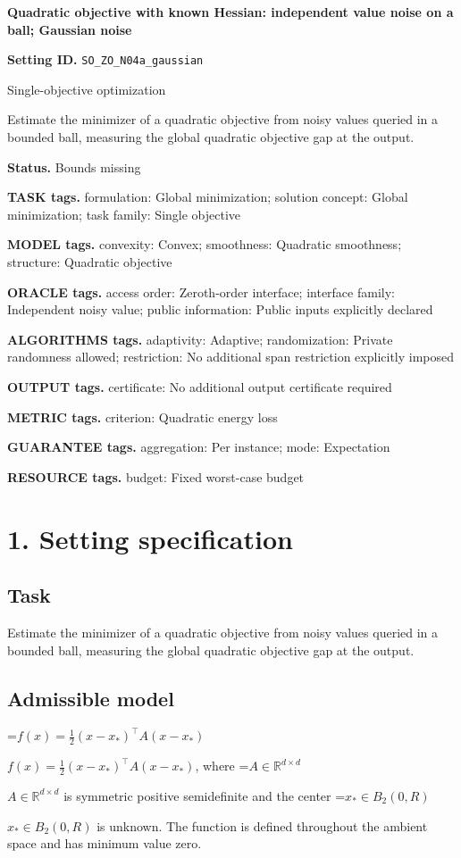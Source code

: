 \documentclass[10pt,a4paper]{article}
\newcommand{\AtlasMath}[1]{\par\begingroup\centering\setbox0=\hbox{$\displaystyle #1$}\ifdim\wd0>1.4\linewidth\typeout{ATLAS WIDE FORMULA: \the\wd0}\fi\ifdim\wd0>\linewidth\resizebox{\linewidth}{!}{\box0}\else\box0\fi\par\endgroup}
\newcommand{\AtlasInlineMath}[1]{\begingroup\setbox0=\hbox{$#1$}\ifdim\wd0>.4\linewidth\endgroup\AtlasMath{#1}\else\endgroup$#1$\fi}
\begin{document}
\raggedright

{\LARGE\bfseries\sffamily\color{AtlasNavy} Quadratic objective with known Hessian: independent value noise on a ball; Gaussian noise\par}\vspace{5pt}
\textbf{Setting ID.} \texttt{SO\_\allowbreak{}ZO\_\allowbreak{}N04a\_\allowbreak{}gaussian}

Single-objective optimization

Estimate the minimizer of a quadratic objective from noisy values queried in a bounded ball, measuring the global quadratic objective gap at the output.

\textbf{Status.} Bounds missing

\textbf{TASK tags.} formulation: Global minimization; solution concept: Global minimization; task family: Single objective

\textbf{MODEL tags.} convexity: Convex; smoothness: Quadratic smoothness; structure: Quadratic objective

\textbf{ORACLE tags.} access order: Zeroth-order interface; interface family: Independent noisy value; public information: Public inputs explicitly declared

\textbf{ALGORITHMS tags.} adaptivity: Adaptive; randomization: Private randomness allowed; restriction: No additional span restriction explicitly imposed

\textbf{OUTPUT tags.} certificate: No additional output certificate required

\textbf{METRIC tags.} criterion: Quadratic energy loss

\textbf{GUARANTEE tags.} aggregation: Per instance; mode: Expectation

\textbf{RESOURCE tags.} budget: Fixed worst-case budget

\section{1. Setting specification}
\subsection{Task}
Estimate the minimizer of a quadratic objective from noisy values queried in a bounded ball, measuring the global quadratic objective gap at the output.

\subsection{Admissible model}
\AtlasInlineMath{f(x)=\frac12(x-x_*)^\top A(x-x_*)}, where \AtlasInlineMath{A\in\mathbb{R}^{d\times d}} is symmetric positive semidefinite and the center \AtlasInlineMath{x_*\in B_2(0,R)} is unknown. The function is defined throughout the ambient space and has minimum value zero.
\end{document}
